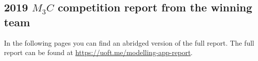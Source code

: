 \subsection{2019 $M_3C$ competition report from the winning team}
\label{2019M3C}

%

\begin{minipage}{.7\textwidth}
In the following pages you can find an abridged version of the full report. The full report can be found at \href{https://uoft.me/modelling-app-report}{https://uoft.me/modelling-app-report}.	
\end{minipage}
\hfill
\begin{minipage}{.25\textwidth}
\end{minipage}


	\vfil

	\hfil {}

